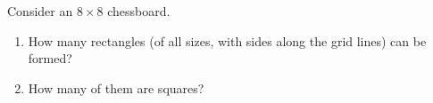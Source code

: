 Consider an $8\times8$ chessboard.
\begin{enumerate}
\item[(a)] How many rectangles (of all sizes, with sides along the grid lines) can be formed?
\item[(b)] How many of them are squares?
\end{enumerate}
